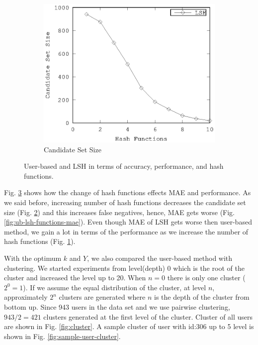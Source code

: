\documentclass[conference]{IEEEtran}
\begin{document}
\begin{figure}[!h]
\begin{subfigure}[b]{0.225\textwidth}
                \label{fig:ub-lsh-functions-runtime}
        \end{subfigure} 
        \\
         \begin{subfigure}[b]{0.225\textwidth}
                \includegraphics[width=\textwidth]{charts/lsh-canidate-hash-functions.eps}
                \caption{Candidate Set Size}
                \label{fig:lsh-functions-candidate-size}
        \end{subfigure} 
        \caption{User-based and LSH in terms of accuracy, performance, and hash functions.}
        \label{fig:ub-lsh-functions}
\end{figure}

Fig. \ref{fig:ub-lsh-functions} shows how the change of 
hash functions effects MAE and performance. As we said before, increasing number of 
hash functions decreases the candidate set size 
(Fig. \ref{fig:lsh-functions-candidate-size}) 
and this increases false negatives, hence, MAE gets worse 
(Fig. \ref{fig:ub-lsh-functions-mae}). 
Even though MAE of LSH gets worse then user-based method, we gain a lot in 
terms of the performance as we increase the number of hash functions (Fig. \ref{fig:ub-lsh-functions-runtime}). 

With the optimum $k$ and $Y$, we also compared the user-based method with 
clustering. We started experiments from level(depth) 0 which is the root of the
cluster and increased the level up to 20. When $n=0$ there is only one cluster
($2^0 = 1$). If we assume the equal distribution of the cluster, at level $n$,
approximately $2^n$ clusters are generated where $n$ is the depth of the 
cluster from bottom up. Since 943 users in the data set and we use pairwise 
clustering, $943/2 = 421$ clusters generated at the first level of the cluster.
Cluster of all users are shown in Fig. \ref{fig:cluster}. A sample cluster of 
user with id:306 up to 5 level is shown in Fig. \ref{fig:sample-user-cluster}.
\end{document}
